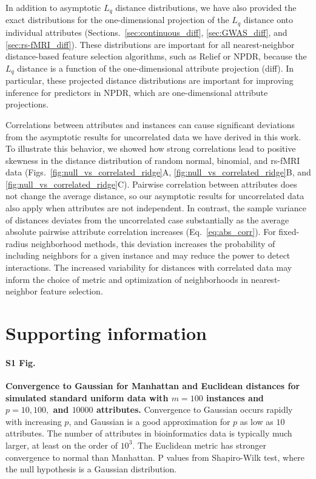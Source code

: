 \documentclass[10pt,letterpaper]{article}
\begin{document}
In addition to asymptotic $L_q$ distance distributions, we have also provided the exact distributions for the one-dimensional projection of the $L_q$ distance onto individual attributes (Sections.~\ref{sec:continuous_diff}, \ref{sec:GWAS_diff}, and \ref{sec:rs-fMRI_diff}). These distributions are important for all nearest-neighbor distance-based feature selection algorithms, such as Relief or NPDR, because the $L_q$ distance is a function of the one-dimensional attribute projection (diff). In particular, these projected distance distributions are important for improving inference for predictors in NPDR, which are one-dimensional attribute projections.

Correlations between attributes and instances can cause significant deviations from the asymptotic results for uncorrelated data we have derived in this work. To illustrate this behavior, we showed how strong correlations lead to positive skewness in the distance distribution of random normal, binomial, and rs-fMRI data (Figs.~\ref{fig:null_vs_correlated_ridge}A, \ref{fig:null_vs_correlated_ridge}B, and \ref{fig:null_vs_correlated_ridge}C). Pairwise correlation between attributes does not change the average distance, so our asymptotic results for uncorrelated data also apply when attributes are not independent. In contrast, the sample variance of distances deviates from the uncorrelated case substantially as the average absolute pairwise attribute correlation increases (Eq.~\ref{eq:abs_corr}). For fixed-radius neighborhood methods, this deviation increases the probability of including neighbors for a given instance and may reduce the power to detect interactions. The increased variability for distances with correlated data may inform the choice of metric and optimization of neighborhoods in nearest-neighbor feature selection. 

\section*{Supporting information}

\paragraph*{S1 Fig.}
\label{S1_Fig}
{\bf Convergence to Gaussian for Manhattan and Euclidean distances for simulated standard uniform data with $m=100$ instances and $p=10, 100,$ and $10000$ attributes.} Convergence to Gaussian occurs rapidly with increasing $p$, and Gaussian is a good approximation for $p$ as low as $10$ attributes. The number of attributes in bioinformatics data is typically much larger, at least on the order of $10^3$. The Euclidean metric has stronger convergence to normal than Manhattan. P values from Shapiro-Wilk test, where the null hypothesis is a Gaussian distribution.
\end{document}
